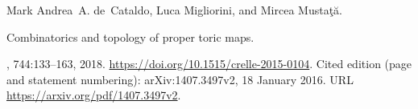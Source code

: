Mark Andrea~A. de~Cataldo, Luca Migliorini, and Mircea Musta\c{t}\u{a}.

\newblock Combinatorics and topology of proper toric maps.

, 744:133--163, 2018.
\newblock \url{https://doi.org/10.1515/crelle-2015-0104}.
\newblock Cited edition (page and statement numbering): arXiv:1407.3497v2, 18 January 2016.
\newblock URL \url{https://arxiv.org/pdf/1407.3497v2}.

